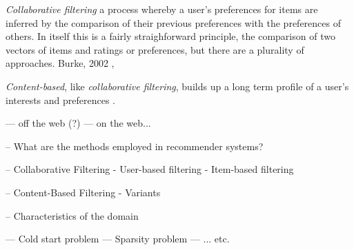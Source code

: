 \textit{Collaborative filtering} a process whereby a user's preferences for items are inferred by the comparison of their previous preferences with the preferences of others. In itself this is a fairly straighforward principle, the comparison of two vectors of items and ratings or preferences, but there are a plurality of approaches. Burke, 2002 \cite{Burke02}, 

\textit{Content-based}, like \textit{collaborative filtering}, builds up a long term profile of a user's interests and preferences \cite{Burke02}.







--- off the web (?)
--- on the web...

-- What are the methods employed in recommender systems?

-- Collaborative Filtering
  - User-based filtering
  - Item-based filtering

-- Content-Based Filtering
  - Variants

-- Characteristics of the domain

--- Cold start problem
--- Sparsity problem
--- ... etc.

